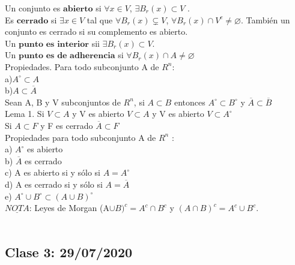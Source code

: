 \documentclass[secnumarabic,balancelastpage,amsmath,amssymb]{article}
\begin{document}
Un conjunto es $\textbf{abierto}$ si $\forall x \in V$, $\exists B_{r} (x) \subset V$ .\\ Es $\textbf{cerrado}$ si $\exists x \in V$ tal que $\forall B_{r} (x) \varsubsetneq V$,
$\forall B_{r} (x) \cap V^{c} \neq \varnothing$. También un conjunto es cerrado si su complemento es abierto.\\
Un $\textbf{punto es interior}$ sii $\exists B_{r} (x) \subset V$.\\
Un $\textbf{punto es de adherencia}$ si $\forall B_{r} (x) \cap A \neq \varnothing$\\
Propiedades. Para todo subconjunto A de $R^{n}$: \\
a)$A^{\circ} \subset A$ \\
b)$A \subset \overline{A}$\\
Sean A, B y V subconjuntos de $R^{n}$, si $A \subset B$ entonces $A^{\circ} \subset B^{\circ}$ y $\overline{A} \subset \overline{B}$\\
Lema 1. Si $V \subset A$ y V es abierto $V  \subset A$ y V es abierto $V \subset A^{\circ}$ \\
Si $A \subset F$ y F es cerrado $\overline{A} \subset F$\\
Propiedades para todo subconjunto A de $R^{n}$ :\\
a) $A^{\circ}$ es abierto\\
b) $\overline{A}$ es cerrado\\
c) A es abierto si y sólo si $A=A^{\circ}$\\
d) A es cerrado si y sólo si $A=\overline{A}$\\
e) $A^{\circ} \cup B^{\circ} \subset (A\cup B)^{\circ}$\\
$\underline{NOTA}$: Leyes de Morgan (A$\cup B)^{c} = A^{c} \cap B^{c}$ y $(A\cap B)^{c} = A^{c} \cup B^{c}$. 
\\\\\subsection{Clase 3: 29/07/2020}
\end{document}
